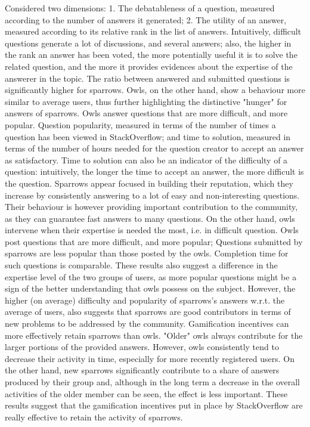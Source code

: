 Considered two dimensions:
1.	The debatableness of a question, measured according to the number of answers it generated;
2.	The utility of an answer, measured according to its relative rank in the list of answers.
Intuitively, difficult questions generate a lot of discussions, and several answers; also, the higher in the rank an answer has been voted, the more potentially useful it is to solve the related question, and the more it provides evidences about the expertise of the answerer in the topic.
The ratio between answered and submitted questions is significantly higher for sparrows. Owls, on the other hand, show a behaviour more similar to average users,  thus further highlighting the distinctive "hunger" for answers of sparrows.
Owls answer questions that are more difficult, and more popular. Question popularity, measured in terms of the number of times a question has been viewed in StackOverflow; and time to solution, measured in terms of the number of hours needed for the question creator to accept an answer as satisfactory. Time to solution can also be an indicator of the difficulty of a question: intuitively, the longer the time to accept an answer, the more difficult is the question.
Sparrows appear focused in building their reputation, which they increase by consistently answering to a lot of easy and non-interesting questions. Their behaviour is however providing important contribution to the community, as they can guarantee fast answers to many questions. On the other hand, owls intervene when their expertise is needed the most, i.e. in difficult question.
Owls post questions that are more difficult, and more popular; Questions submitted by sparrows are less popular than those posted by the owls. Completion time for such questions is comparable. These results also suggest a difference in the expertise level of the two groups of users, as more popular questions might be a sign of the better understanding that owls possess on the subject. However, the higher (on average) difficulty and popularity of sparrows’s answers w.r.t. the average of users, also suggests that sparrows are good contributors in terms of new problems to be addressed by the community.
Gamification incentives can more effectively retain sparrows than owls. "Older" owls always contribute for the larger portions of the provided answers. However, owls consistently tend to decrease their activity in time, especially for more recently registered users. On the other hand, new sparrows significantly contribute to a share of answers produced by their group and, although in the long term a decrease in the overall activities of the older member can be seen, the effect is less important. These results suggest that the gamification incentives put in place by StackOverflow are really effective to retain the activity of sparrows.
\cite{Yang2014}


